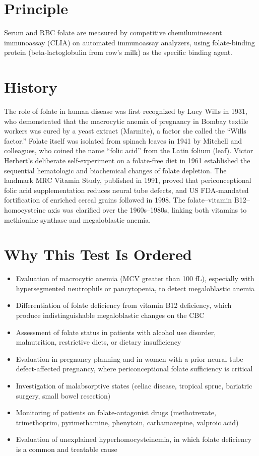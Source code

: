 \section*{Principle}
Serum and RBC folate are measured by competitive chemiluminescent immunoassay (CLIA) on automated immunoassay analyzers, using folate-binding protein (beta-lactoglobulin from cow's milk) as the specific binding agent.
\section*{History}
The role of folate in human disease was first recognized by Lucy Wills in 1931, who demonstrated that the macrocytic anemia of pregnancy in Bombay textile workers was cured by a yeast extract (Marmite), a factor she called the ``Wills factor.'' Folate itself was isolated from spinach leaves in 1941 by Mitchell and colleagues, who coined the name ``folic acid'' from the Latin folium (leaf). Victor Herbert's deliberate self-experiment on a folate-free diet in 1961 established the sequential hematologic and biochemical changes of folate depletion. The landmark MRC Vitamin Study, published in 1991, proved that periconceptional folic acid supplementation reduces neural tube defects, and US FDA-mandated fortification of enriched cereal grains followed in 1998. The folate--vitamin B12--homocysteine axis was clarified over the 1960s--1980s, linking both vitamins to methionine synthase and megaloblastic anemia.
\section*{Why This Test Is Ordered}
\begin{itemize}
  \item Evaluation of macrocytic anemia (MCV greater than 100 fL), especially with hypersegmented neutrophils or pancytopenia, to detect megaloblastic anemia
  \item Differentiation of folate deficiency from vitamin B12 deficiency, which produce indistinguishable megaloblastic changes on the CBC
  \item Assessment of folate status in patients with alcohol use disorder, malnutrition, restrictive diets, or dietary insufficiency
  \item Evaluation in pregnancy planning and in women with a prior neural tube defect-affected pregnancy, where periconceptional folate sufficiency is critical
  \item Investigation of malabsorptive states (celiac disease, tropical sprue, bariatric surgery, small bowel resection)
  \item Monitoring of patients on folate-antagonist drugs (methotrexate, trimethoprim, pyrimethamine, phenytoin, carbamazepine, valproic acid)
  \item Evaluation of unexplained hyperhomocysteinemia, in which folate deficiency is a common and treatable cause
\end{itemize}
